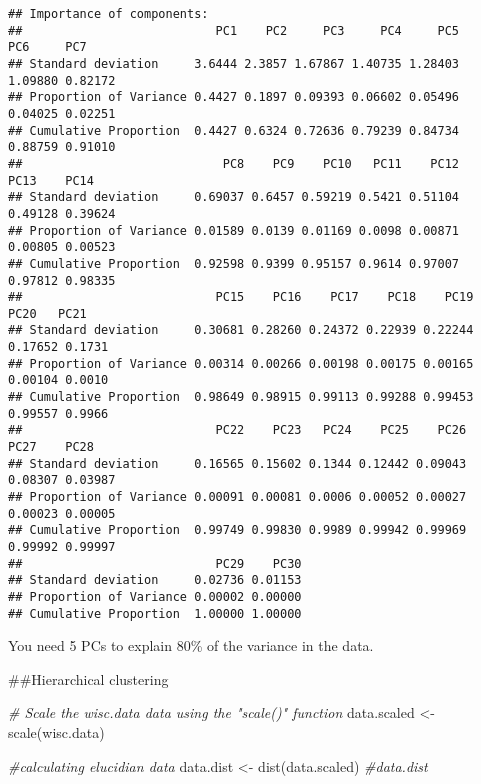 \documentclass[
]{article}
\newenvironment{Shaded}{\begin{snugshade}}{\end{snugshade}}
\newcommand{\CommentTok}[1]{\textcolor[rgb]{0.56,0.35,0.01}{\textit{#1}}}
\newcommand{\FunctionTok}[1]{\textcolor[rgb]{0.00,0.00,0.00}{#1}}
\newcommand{\NormalTok}[1]{#1}
\newcommand{\OtherTok}[1]{\textcolor[rgb]{0.56,0.35,0.01}{#1}}
\begin{document}
\begin{verbatim}
## Importance of components:
##                           PC1    PC2     PC3     PC4     PC5     PC6     PC7
## Standard deviation     3.6444 2.3857 1.67867 1.40735 1.28403 1.09880 0.82172
## Proportion of Variance 0.4427 0.1897 0.09393 0.06602 0.05496 0.04025 0.02251
## Cumulative Proportion  0.4427 0.6324 0.72636 0.79239 0.84734 0.88759 0.91010
##                            PC8    PC9    PC10   PC11    PC12    PC13    PC14
## Standard deviation     0.69037 0.6457 0.59219 0.5421 0.51104 0.49128 0.39624
## Proportion of Variance 0.01589 0.0139 0.01169 0.0098 0.00871 0.00805 0.00523
## Cumulative Proportion  0.92598 0.9399 0.95157 0.9614 0.97007 0.97812 0.98335
##                           PC15    PC16    PC17    PC18    PC19    PC20   PC21
## Standard deviation     0.30681 0.28260 0.24372 0.22939 0.22244 0.17652 0.1731
## Proportion of Variance 0.00314 0.00266 0.00198 0.00175 0.00165 0.00104 0.0010
## Cumulative Proportion  0.98649 0.98915 0.99113 0.99288 0.99453 0.99557 0.9966
##                           PC22    PC23   PC24    PC25    PC26    PC27    PC28
## Standard deviation     0.16565 0.15602 0.1344 0.12442 0.09043 0.08307 0.03987
## Proportion of Variance 0.00091 0.00081 0.0006 0.00052 0.00027 0.00023 0.00005
## Cumulative Proportion  0.99749 0.99830 0.9989 0.99942 0.99969 0.99992 0.99997
##                           PC29    PC30
## Standard deviation     0.02736 0.01153
## Proportion of Variance 0.00002 0.00000
## Cumulative Proportion  1.00000 1.00000
\end{verbatim}

You need 5 PCs to explain 80\% of the variance in the data.

\#\#Hierarchical clustering

\begin{Shaded}
\begin{Highlighting}[]
\CommentTok{\# Scale the wisc.data data using the "scale()" function}
\NormalTok{data.scaled }\OtherTok{\textless{}{-}} \FunctionTok{scale}\NormalTok{(wisc.data)}
\end{Highlighting}
\end{Shaded}

\begin{Shaded}
\begin{Highlighting}[]
\CommentTok{\#calculating elucidian data}
\NormalTok{data.dist }\OtherTok{\textless{}{-}} \FunctionTok{dist}\NormalTok{(data.scaled)}
\CommentTok{\#data.dist}
\end{Highlighting}
\end{Shaded}
\end{document}

